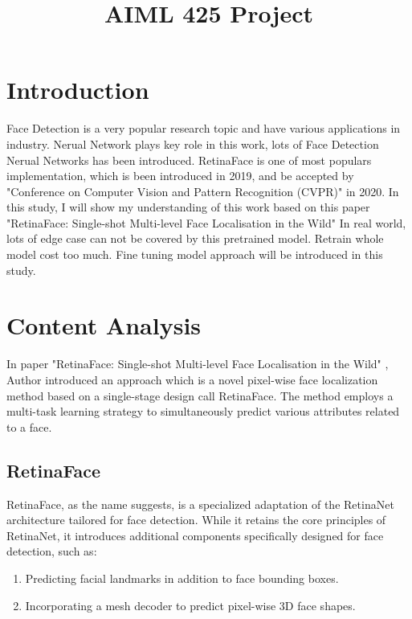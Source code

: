 \documentclass{article}
\title{AIML 425 Project}
\begin{document}
%
\maketitle
%
\section{Introduction}
\label{sec:intro}

Face Detection is a very popular research topic and have various applications in industry.
Nerual Network plays key role in this work, lots of Face Detection Nerual Networks has been introduced.
RetinaFace is one of most populars implementation, which is been introduced in 2019, 
and be accepted by "Conference on Computer Vision and Pattern Recognition (CVPR)" in 2020.
In this study, I will show my understanding of this work based on this paper "RetinaFace: Single-shot Multi-level Face Localisation in the Wild" \cite{deng2020retinaface}
In real world, lots of edge case can not be covered by this pretrained model.
Retrain whole model cost too much.
Fine tuning model approach will be introduced in this study.


\section{Content Analysis}
\label{sec:content}

In paper "RetinaFace: Single-shot Multi-level Face Localisation in the Wild" \cite{deng2020retinaface}, 
Author introduced an approach which is a  novel pixel-wise face localization method based on a single-stage design call RetinaFace. 
The method employs a multi-task learning strategy to simultaneously predict various attributes related to a face. 

\subsection{RetinaFace}

RetinaFace, as the name suggests, is a specialized adaptation of the RetinaNet architecture tailored for face detection. While it retains the core principles of RetinaNet, it introduces additional components specifically designed for face detection, such as:

\begin{enumerate}
\item Predicting facial landmarks in addition to face bounding boxes.
\item Incorporating a mesh decoder to predict pixel-wise 3D face shapes.
\end{enumerate}
\end{document}
